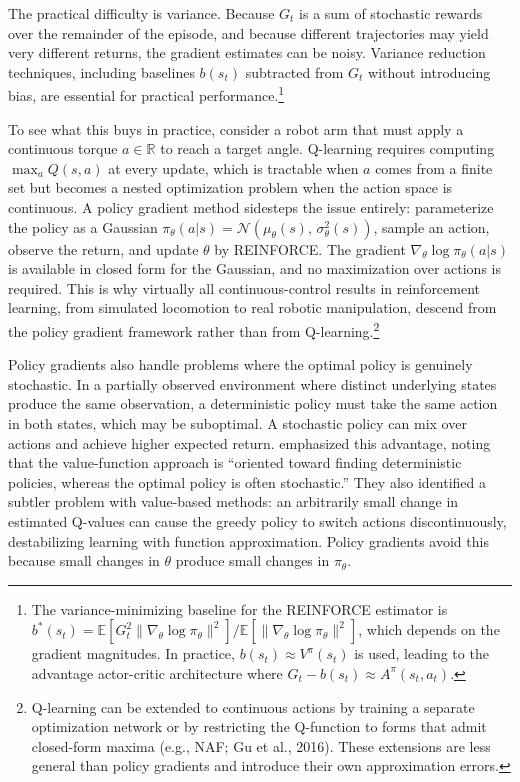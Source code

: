 The practical difficulty is variance. Because $G_t$ is a sum of stochastic rewards over the remainder of the episode, and because different trajectories may yield very different returns, the gradient estimates can be noisy. Variance reduction techniques, including baselines $b(s_t)$ subtracted from $G_t$ without introducing bias, are essential for practical performance.\footnote{The variance-minimizing baseline for the REINFORCE estimator is $b^*(s_t) = \mathbb{E}[G_t^2 \|\nabla_\theta \log \pi_\theta\|^2] / \mathbb{E}[\|\nabla_\theta \log \pi_\theta\|^2]$, which depends on the gradient magnitudes. In practice, $b(s_t) \approx V^\pi(s_t)$ is used, leading to the advantage actor-critic architecture where $G_t - b(s_t) \approx A^\pi(s_t, a_t)$.}

To see what this buys in practice, consider a robot arm that must apply a continuous torque $a \in \mathbb{R}$ to reach a target angle. Q-learning requires computing $\max_a Q(s,a)$ at every update, which is tractable when $a$ comes from a finite set but becomes a nested optimization problem when the action space is continuous. A policy gradient method sidesteps the issue entirely: parameterize the policy as a Gaussian $\pi_\theta(a|s) = \mathcal{N}(\mu_\theta(s),\, \sigma_\theta^2(s))$, sample an action, observe the return, and update $\theta$ by REINFORCE. The gradient $\nabla_\theta \log \pi_\theta(a|s)$ is available in closed form for the Gaussian, and no maximization over actions is required. This is why virtually all continuous-control results in reinforcement learning, from simulated locomotion to real robotic manipulation, descend from the policy gradient framework rather than from Q-learning.\footnote{Q-learning can be extended to continuous actions by training a separate optimization network or by restricting the Q-function to forms that admit closed-form maxima (e.g., NAF; Gu et al., 2016). These extensions are less general than policy gradients and introduce their own approximation errors.}

Policy gradients also handle problems where the optimal policy is genuinely stochastic. In a partially observed environment where distinct underlying states produce the same observation, a deterministic policy must take the same action in both states, which may be suboptimal. A stochastic policy can mix over actions and achieve higher expected return. \citet{SuttonMcAllester2000} emphasized this advantage, noting that the value-function approach is ``oriented toward finding deterministic policies, whereas the optimal policy is often stochastic.'' They also identified a subtler problem with value-based methods: an arbitrarily small change in estimated Q-values can cause the greedy policy to switch actions discontinuously, destabilizing learning with function approximation. Policy gradients avoid this because small changes in $\theta$ produce small changes in $\pi_\theta$.

